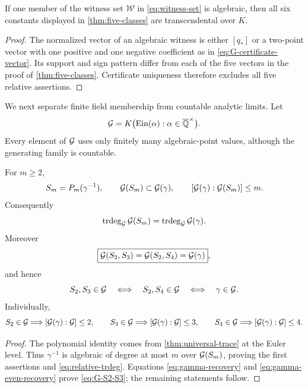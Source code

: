 \begin{corollary}
\label{cor:witness-all-K-trans}
If one member of the witness set \(\mathcal W\) in
\eqref{eq:witness-set} is algebraic, then all six constants displayed in
\cref{thm:five-classes} are transcendental over \(K\).
\end{corollary}

\begin{proof}
The normalized vector of an algebraic witness is either \([q_*]\) or a
two-point vector with one positive and one negative coefficient as in
\eqref{eq:G-certificate-vector}.  Its support and sign pattern differ from
each of the five vectors in the proof of \cref{thm:five-classes}.  Certificate
uniqueness therefore excludes all five relative assertions.
\end{proof}

We next separate finite field membership from countable analytic limits.
Let
\begin{equation}\label{eq:G-field}
 \mathcal G=K\bigl(\operatorname{Ein}(\alpha):\alpha\in\overline{\mathbb Q}^\times\bigr).
\end{equation}
Every element of \(\mathcal G\) uses only finitely many algebraic-point values,
although the generating family is countable.

\begin{proposition}
\label{prop:relative-trace-descent}
For \(m\ge2\),
\[
 S_m=P_m(\gamma^{-1}),\qquad
 \mathcal G(S_m)\subset\mathcal G(\gamma),\qquad
 [\mathcal G(\gamma):\mathcal G(S_m)]\le m.
\]
Consequently
\begin{equation}\label{eq:relative-trdeg}
 \operatorname{trdeg}_{\mathcal G}\mathcal G(S_m)=\operatorname{trdeg}_{\mathcal G}\mathcal G(\gamma).
\end{equation}
Moreover
\begin{equation}\label{eq:G-S2-S3}
 \boxed{\mathcal G(S_2,S_3)=\mathcal G(S_2,S_4)=\mathcal G(\gamma)},
\end{equation}
and hence
\begin{equation}\label{eq:joint-gamma-free}
 S_2,S_3\in\mathcal G
 \quad\Longleftrightarrow\quad
 S_2,S_4\in\mathcal G
 \quad\Longleftrightarrow\quad
 \gamma\in\mathcal G.
\end{equation}
Individually,
\[
 S_2\in\mathcal G\Longrightarrow[\mathcal G(\gamma):\mathcal G]\le2,
 \qquad
 S_3\in\mathcal G\Longrightarrow[\mathcal G(\gamma):\mathcal G]\le3,
 \qquad
 S_4\in\mathcal G\Longrightarrow[\mathcal G(\gamma):\mathcal G]\le4.
\]
\end{proposition}

\begin{proof}
The polynomial identity comes from \cref{thm:universal-trace} at the Euler
level.  Thus \(\gamma^{-1}\) is algebraic of degree at most \(m\) over
\(\mathcal G(S_m)\), proving the first assertions and
\eqref{eq:relative-trdeg}.  Equations \eqref{eq:gamma-recovery} and
\eqref{eq:gamma-even-recovery} prove \eqref{eq:G-S2-S3}; the remaining
statements follow.
\end{proof}

